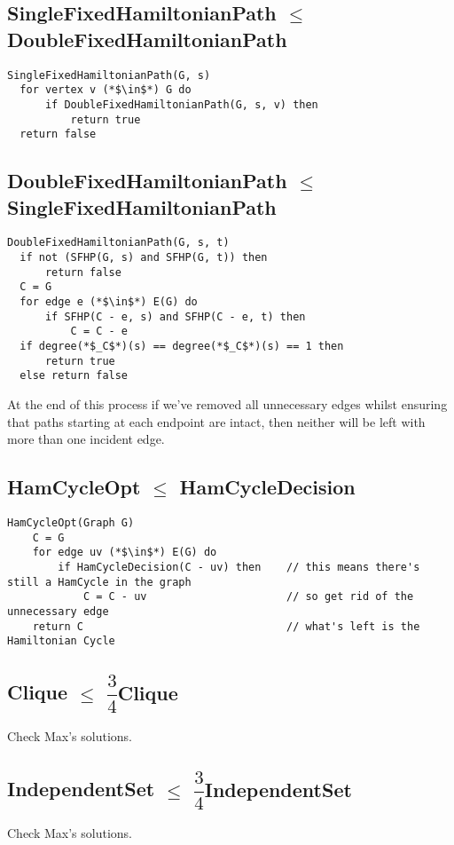\documentclass[12pt]{article}
\providecommand{\reducible}[2]{
  \textbf{#1} $\leq$ \textbf{#2}
}
\begin{document}
\subsection{\reducible{SingleFixedHamiltonianPath}{DoubleFixedHamiltonianPath}}
\begin{lstlisting}
SingleFixedHamiltonianPath(G, s)
  for vertex v (*$\in$*) G do
      if DoubleFixedHamiltonianPath(G, s, v) then
          return true
  return false
\end{lstlisting}

\subsection{\reducible{DoubleFixedHamiltonianPath}{SingleFixedHamiltonianPath}}
\begin{lstlisting}
DoubleFixedHamiltonianPath(G, s, t)
  if not (SFHP(G, s) and SFHP(G, t)) then
      return false
  C = G
  for edge e (*$\in$*) E(G) do
      if SFHP(C - e, s) and SFHP(C - e, t) then
          C = C - e
  if degree(*$_C$*)(s) == degree(*$_C$*)(s) == 1 then
      return true
  else return false
\end{lstlisting}
At the end of this process if we've removed all unnecessary edges whilst ensuring that paths starting at each endpoint are
intact, then neither will be left with more than one incident edge.

\subsection{\reducible{HamCycleOpt}{HamCycleDecision}}
\begin{lstlisting}
HamCycleOpt(Graph G)
    C = G
    for edge uv (*$\in$*) E(G) do
        if HamCycleDecision(C - uv) then    // this means there's still a HamCycle in the graph
            C = C - uv                      // so get rid of the unnecessary edge
    return C                                // what's left is the Hamiltonian Cycle
\end{lstlisting}


\subsection{\reducible{Clique}{$\dfrac{3}{4}$Clique}}
Check Max's solutions.

\subsection{\reducible{IndependentSet}{$\dfrac{3}{4}$IndependentSet}}
Check Max's solutions.
\end{document}
